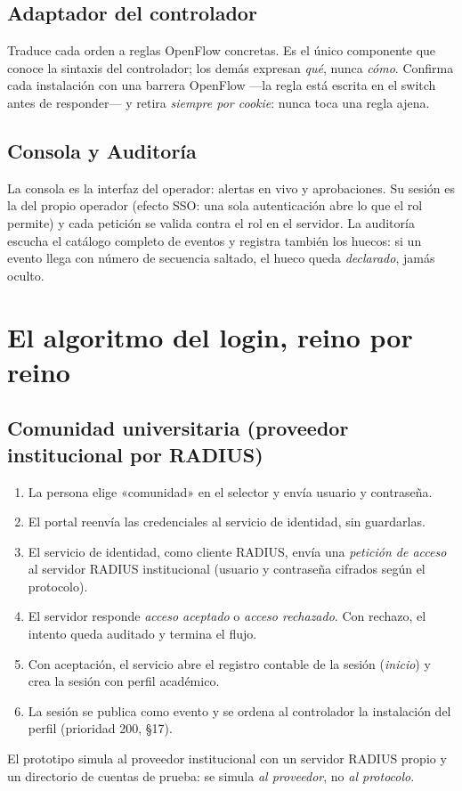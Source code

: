 \documentclass[11pt,a4paper]{article}
\begin{document}
\subsection{Adaptador del controlador}
Traduce cada orden a reglas OpenFlow concretas. Es el único componente que conoce la sintaxis del controlador; los demás expresan \emph{qué}, nunca \emph{cómo}. Confirma cada instalación con una barrera OpenFlow ---la regla está escrita en el switch antes de responder--- y retira \emph{siempre por cookie}: nunca toca una regla ajena.

\subsection{Consola y Auditoría}
La consola es la interfaz del operador: alertas en vivo y aprobaciones. Su sesión es la del propio operador (efecto SSO: una sola autenticación abre lo que el rol permite) y cada petición se valida contra el rol en el servidor. La auditoría escucha el catálogo completo de eventos y registra también los huecos: si un evento llega con número de secuencia saltado, el hueco queda \emph{declarado}, jamás oculto.

\section{El algoritmo del login, reino por reino}

\subsection{Comunidad universitaria (proveedor institucional por RADIUS)}
\begin{enumerate}
\item La persona elige «comunidad» en el selector y envía usuario y contraseña.
\item El portal reenvía las credenciales al servicio de identidad, sin guardarlas.
\item El servicio de identidad, como cliente RADIUS, envía una \emph{petición de acceso} al servidor RADIUS institucional (usuario y contraseña cifrados según el protocolo).
\item El servidor responde \emph{acceso aceptado} o \emph{acceso rechazado}. Con rechazo, el intento queda auditado y termina el flujo.
\item Con aceptación, el servicio abre el registro contable de la sesión (\emph{inicio}) y crea la sesión con perfil académico.
\item La sesión se publica como evento y se ordena al controlador la instalación del perfil (prioridad 200, §17).
\end{enumerate}
El prototipo simula al proveedor institucional con un servidor RADIUS propio y un directorio de cuentas de prueba: se simula \emph{al proveedor}, no \emph{al protocolo}.
\end{document}
